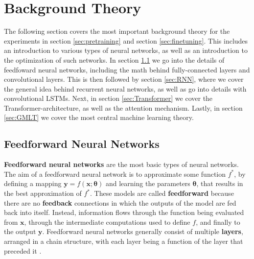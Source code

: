 \documentclass[./main.tex]{subfiles}
\begin{document}
\section{Background Theory}
\label{sec:theory}
The following section covers the most important background theory for the experiments in section \ref{sec:pretraining} and section \ref{sec:finetuning}. This includes an introduction to various types of neural networks, as well as an introduction to the optimization of such networks. In section \ref{sec:FFNN} we go into the details of feedfoward neural networks, including the math behind fully-connected layers and convolutional layers. This is then followed by section \ref{sec:RNN}, where we cover the general idea behind recurrent neural networks, as well as go into details with convolutional LSTMs. Next, in section \ref{sec:Transformer} we cover the Transformer-architecture, as well as the attention mechanism. Lastly, in section \ref{sec:GMLT} we cover the most central machine learning theory.

\subsection{Feedforward Neural Networks}
\label{sec:FFNN}
\textbf{Feedforward neural networks} are the most basic types of neural networks. The aim of a feedforward neural network is to approximate some function $f^*$, by defining a mapping $\bm{y} = f(\bm{x}; \bm{\theta})$ and learning the parameters $\bm{\theta}$, that results in the best approximation of $f^*$. These models are called \textbf{feedforward} because there are no \textbf{feedback} connections in which the outputs of the model are fed back into itself. Instead, information flows through the function being evaluated from $\bm{x}$, through the intermediate computations used to define $f$, and finally to the output $\bm{y}$. Feedforward neural networks generally consist of multiple \textbf{layers}, arranged in a chain structure, with each layer being a function of the layer that preceded it \cite{DL_book}. 
\end{document}
